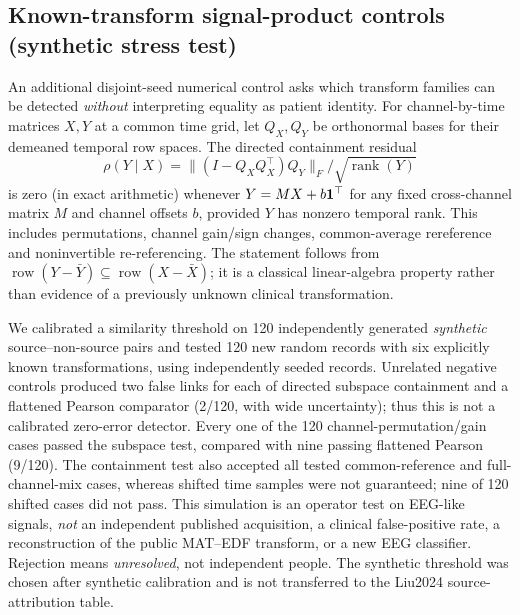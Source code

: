 \subsection{Known-transform signal-product controls (synthetic stress test)}
An additional disjoint-seed numerical control asks which transform families
can be detected \emph{without} interpreting equality as patient identity.
For channel-by-time matrices $X,Y$ at a common time grid,
let $Q_X,Q_Y$ be orthonormal bases for their demeaned temporal
row spaces. The directed containment residual
\[
\rho(Y\mid X)=\|(I-Q_XQ_X^\top)Q_Y\|_F/
\sqrt{\operatorname{rank}(Y)}
\]
is zero (in exact arithmetic) whenever $Y=MX+b{\bf1}^\top$
for any fixed cross-channel matrix $M$ and channel offsets $b$,
provided $Y$ has nonzero temporal rank. This includes permutations,
channel gain/sign changes, common-average rereference and
noninvertible re-referencing. The statement follows from
$\operatorname{row}(Y-\bar Y)\subseteq
\operatorname{row}(X-\bar X)$; it is a classical
linear-algebra property rather than evidence of a previously unknown
clinical transformation.

We calibrated a similarity threshold on 120 independently
generated \emph{synthetic} source--non-source pairs and tested
120 new random records with six explicitly known transformations,
using independently seeded records. Unrelated negative controls
produced two false links for each of directed subspace containment
and a flattened Pearson comparator (2/120, with wide uncertainty);
thus this is not a calibrated zero-error detector. Every one
of the 120 channel-permutation/gain cases passed the subspace test,
compared with nine passing flattened Pearson (9/120). The
containment test also accepted all tested common-reference and
full-channel-mix cases, whereas shifted time samples were not
guaranteed; nine of 120 shifted cases did not pass.
This simulation is an operator test on EEG-like signals, \emph{not}
an independent published acquisition, a clinical false-positive rate,
a reconstruction of the public MAT--EDF transform, or a new EEG
classifier. Rejection means \emph{unresolved}, not independent people.
The synthetic threshold was chosen after synthetic calibration
and is not transferred to the Liu2024 source-attribution table.
